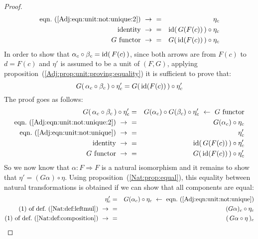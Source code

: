 \begin{proof}
\begin{eqnarray*}
            \mbox{eqn.~(\ref{Adj:eqn:unit:not:unique:2})}\ \to\ 
            &=&\eta_{c}\\
            \mbox{identity}\ \to\ 
            &=&\id(\,G(F(c))\,)\circ\eta_{c}\\
            \mbox{$G$ functor}\ \to\ 
            &=&G(\,\id(F(c))\,)\circ\eta_{c}\\
        \end{eqnarray*}
    In order to show that $\alpha_{c}\circ\beta_{c}=\mbox{\rm id}(\,F(c)\,)$, since both 
    arrows are from $F(c)$ to $d=F(c)$ and $\eta'$ is assumed to be a unit of 
    $(F,G)$, applying proposition~(\ref{Adj:prop:unit:proving:equality}) it is 
    sufficient to prove that:
        \[
            G(\,\alpha_{c}\circ\beta_{c}\,)\circ\eta'_{c} 
            = 
            G(\,\mbox{\rm id}(F(c))\,)\circ\eta'_{c}
        \]
    The proof goes as follows:
        \begin{eqnarray*}G(\,\alpha_{c}\circ\beta_{c}\,)\circ\eta'_{c}
            &=&G(\alpha_{c})\circ G(\beta_{c})\circ\eta'_{c}
            \ \leftarrow\ \mbox{$G$ functor}\\
            \mbox{eqn.~(\ref{Adj:eqn:unit:not:unique:2})}\ \to\ 
            &=&G(\alpha_{c})\circ\eta_{c}\\
            \mbox{eqn.~(\ref{Adj:eqn:unit:not:unique})}\ \to\ 
            &=&\eta'_{c}\\
            \mbox{identity}\ \to\ 
            &=&\id(\,G(F(c))\,)\circ\eta'_{c}\\
            \mbox{$G$ functor}\ \to\ 
            &=&G(\,\id(F(c))\,)\circ\eta'_{c}\\
        \end{eqnarray*}
    So we now know that $\alpha:F\Rightarrow F$ is a natural isomorphism and it 
    remains to show that $\eta'=(G\alpha)\circ\eta$. Using 
    proposition~(\ref{Nat:prop:equal}), this equality between natural
    transformations is obtained if we can show that all components are equal:
        \begin{eqnarray*}\eta'_{c}
            &=&G(\alpha_{c})\circ\eta_{c}
            \ \leftarrow\ \mbox{eqn.~(\ref{Adj:eqn:unit:not:unique})}\\
            \mbox{$(1)$ of def.~(\ref{Nat:def:leftmul})}\ \to\ 
            &=&(G\alpha)_{c}\circ\eta_{c}\\
            \mbox{$(1)$ of def.~(\ref{Nat:def:composition})}\ \to\ 
            &=&(\,G\alpha\circ\eta\,)_{c}\\
        \end{eqnarray*}
\end{proof}
